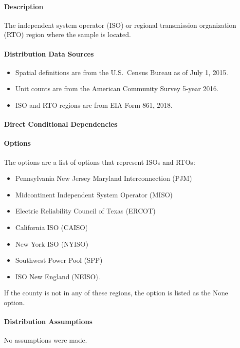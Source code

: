 \paragraph{Description}
% 
The independent system operator (ISO) or regional transmission organization (RTO) region where the sample is located.

\paragraph{Distribution Data Sources}
% 
\begin{itemize}
    \item Spatial definitions are from the U.S.~Census Bureau as of July 1, 2015.
    \item Unit counts are from the American Community Survey 5-year 2016.
    \item ISO and RTO regions are from EIA Form 861, 2018.
\end{itemize}

\paragraph{Direct Conditional Dependencies}


\paragraph{Options}
The options are a list of options that represent ISOs and RTOs:
\begin{itemize}
    \item Pennsylvania New Jersey Maryland Interconnection (PJM)
    \item Midcontinent Independent System Operator (MISO)
    \item Electric Reliability Council of Texas (ERCOT)
    \item California ISO (CAISO)
    \item New York ISO (NYISO)
    \item Southwest Power Pool (SPP)
    \item ISO New England (NEISO).
\end{itemize}
If the county is not in any of these regions, the option is listed as the None option.

\paragraph{Distribution Assumptions}
% 
No assumptions were made.
